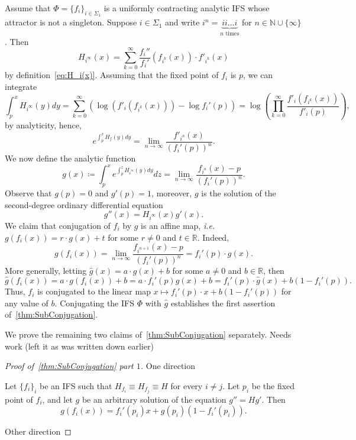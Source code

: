 \documentclass[12pt,]{article}
\def\cref#1{\ref{#1}}%
\theoremstyle{definition}
\theoremstyle{remark}
\renewcommand{\Bbb}[1]{\mathbb{#1}}
\newcommand{\bbR}{{\Bbb R}}        %
\newcommand{\0}{\mathbf{0}}
\newcommand{\ie}{{\it i.e.}\/ }
\begin{document}
{Assume that $\Phi=\{f_i\}_{i\in\Sigma_1}$ is a uniformly contracting analytic IFS whose attractor is
not a singleton. Suppose $i\in\Sigma_1$ and write $i^{n}=\underbrace{ii\ldots i}_{n \text{ times}}$
for $n\in\mathbb{N}\cup\{\infty\}$. Then
\[
H_{i^{\infty}}(x)=\sum_{k=0}^\infty\frac{f_i''}{f_i'}(f_{i^k}(x))\cdot f'_{i^k}(x)
\]
by definition~\cref{eq:H_i(x)}. Assuming that the fixed point of $f_i$ is $p$, we can integrate
\[
\int_p^x H_{i^{\infty}}(y)dy=\sum_{k=0}^\infty\left(\log\left(f'_i(f_{i^k}(x))\right)-\log
f_i'(p)\right)=\log\left(\prod_{k=0}^\infty\frac{f'_i(f_{i^k}(x))}{f'_i(p)}\right),
\]
by analyticity, hence,
\[
e^{\int_p^x H_f(y)dy}=\lim_{n\to\infty}\frac{f'_{i^n}(x)}{(f_i'(p))^n}.
\]
We now define the analytic function
\[
g(x)\coloneqq\int_p^xe^{\int_p^z H_{i^{\infty}}(y)dy}dz=\lim_{n\to\infty}\frac{f_{i^n}(x)-p}{(f_i'(p))^n}.
\]
Observe that $g(p)=0$ and $g'(p)=1$, moreover, $g$ is the solution of the second-degree ordinary
differential equation
\[
g''(x)=H_{i^{\infty}}(x)g'(x).
\]
We claim that conjugation of $f_i$ by $g$ is an affine map, \ie $g(f_i(x))=r\cdot g(x)+t$ for some
$r\neq0$ and $t\in\bbR$. Indeed,
\begin{equation*}
g(f_i(x)) = \lim_{n\to\infty}\frac{f_{i^{n+1}}(x)-p}{(f_i'(p))^n} = f_i'(p)\cdot g(x).
\end{equation*}
More generally, letting $\hat{g}(x)=a\cdot g(x)+b$ for some $a\neq0$ and $b\in\bbR$, then
\[
\hat{g}(f_i(x))=a\cdot g(f_i(x))+b=a\cdot f_i'(p) g(x)+b=f_i'(p)\cdot \hat{g}(x)+b(1-f_i'(p)).
\]
Thus, $f_i$ is conjugated to the linear map $x\mapsto f_i'(p)\cdot x+b(1-f_i'(p))$ for any value of
$b$. Conjugating the IFS $\Phi$ with $\hat{g}$ establishes the first assertion
of~\cref{thm:SubConjugation}.

We prove the remaining two claims of~\cref{thm:SubConjugation} separately. {\color{red} Needs work
(left it as was written down earlier)}

\begin{proof}[Proof of~\cref{thm:SubConjugation} part $1$]
One direction

Let $\{f_i\}_{i}$ be an IFS such that $H_{f_i}\equiv H_{f_j}\equiv H$ for every $i\neq j$. Let $p_i$
be the fixed point of $f_i$, and let
$g$ be an arbitrary solution of the equation $g''=Hg'$. Then
$$
g(f_i(x))=f_i'(p_i)x+g(p_i)(1-f_i'(p_i)).
$$

Other direction


\end{proof}}
\end{document}
